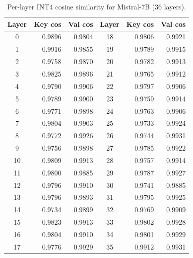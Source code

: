 \documentclass[11pt]{article}
\theoremstyle{plain}
\theoremstyle{definition}
\begin{document}
\begin{table}[H]
\centering
\caption{Per-layer INT4 cosine similarity for Mistral-7B (36 layers).}
\label{tab:per-layer-mistral}
\small
\begin{tabular}{crr|crr}
\toprule
Layer & Key cos & Val cos & Layer & Key cos & Val cos \\
\midrule
0 & 0.9896 & 0.9804 & 18 & 0.9806 & 0.9921 \\
1 & 0.9916 & 0.9855 & 19 & 0.9789 & 0.9915 \\
2 & 0.9758 & 0.9870 & 20 & 0.9782 & 0.9913 \\
3 & 0.9825 & 0.9896 & 21 & 0.9765 & 0.9912 \\
4 & 0.9790 & 0.9906 & 22 & 0.9797 & 0.9906 \\
5 & 0.9789 & 0.9900 & 23 & 0.9759 & 0.9914 \\
6 & 0.9771 & 0.9898 & 24 & 0.9763 & 0.9906 \\
7 & 0.9804 & 0.9903 & 25 & 0.9733 & 0.9924 \\
8 & 0.9772 & 0.9926 & 26 & 0.9744 & 0.9931 \\
9 & 0.9756 & 0.9898 & 27 & 0.9785 & 0.9922 \\
10 & 0.9809 & 0.9913 & 28 & 0.9757 & 0.9914 \\
11 & 0.9800 & 0.9885 & 29 & 0.9787 & 0.9927 \\
12 & 0.9796 & 0.9910 & 30 & 0.9741 & 0.9885 \\
13 & 0.9796 & 0.9893 & 31 & 0.9795 & 0.9925 \\
14 & 0.9734 & 0.9899 & 32 & 0.9769 & 0.9909 \\
15 & 0.9823 & 0.9913 & 33 & 0.9802 & 0.9928 \\
16 & 0.9804 & 0.9910 & 34 & 0.9801 & 0.9929 \\
17 & 0.9776 & 0.9929 & 35 & 0.9912 & 0.9931 \\
\bottomrule
\end{tabular}
\end{table}
\end{document}
